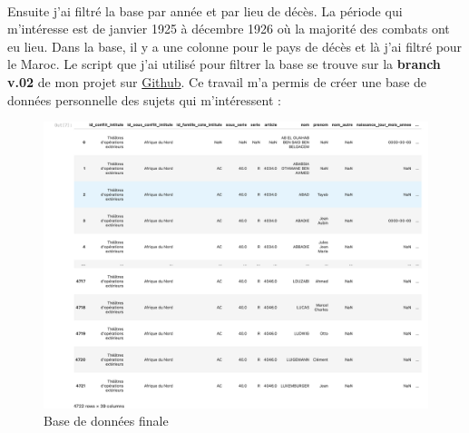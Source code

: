 \documentclass[12pt]{article}
\begin{document}
\paragraph*{}
Ensuite j'ai filtré la base par année et par lieu de décès. La période qui m'intéresse est de janvier 1925 à décembre 1926 où la majorité des combats ont eu lieu. Dans la base, il y a une colonne pour le pays de décès et là j'ai filtré pour le Maroc. Le script que j'ai utilisé pour filtrer la base se trouve sur la \textbf{branch v.02} de mon projet sur \href{https://github.com/the0phil3/projetMemoire/tree/v.02}{Github}. Ce travail m'a permis de créer une base de données personnelle des sujets qui m'intéressent :
\begin{figure}[h]
    \centering
    \includegraphics[scale=0.27]{mortsduRif.png}
    \caption{Base de données finale}
    \label{fig:Base finale}
\end{figure} 
\end{document}
